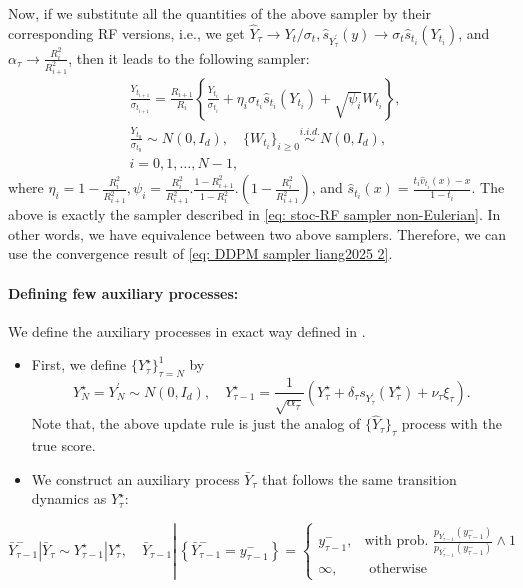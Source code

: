 \documentclass{article}
\theoremstyle{plain}
\theoremstyle{definition}
\theoremstyle{remark}
\newcommand{\bc}[1]{\left\{{#1}\right\}}
\newcommand{\br}[1]{\left({#1}\right)}
\begin{document}
Now, if we substitute all the quantities of the above sampler by their corresponding RF versions, i.e.,  we get 
$\hat Y_\tau \rightarrow  Y_{t}/\sigma_t, \widehat s_{Y^\prime_\tau }(y) \rightarrow \sigma_t \widehat s_{t_i}(Y_{t_i})$, and $\alpha_\tau \rightarrow \frac{R_i^2}{R_{i+1}^2} $, then it leads to the following sampler:
\begin{equation}
     \begin{aligned}
      &\frac{Y_{t_{i+1}}}{\sigma_{t_{i+1}}} = \frac{R_{i+1}}{R_i} \bc{ \frac{Y_{t_i}}{\sigma_{t_i}} + \eta_i \sigma_{t_i} \widehat s_{t_i}(Y_{t_i}) + \sqrt{\psi_i} W_{t_i}},\\
      &  \frac{Y_{t_0}}{\sigma_{t_0}} \sim N(0,  I_d), \quad \{W_{t_i}\}_{i \ge 0}\overset{i.i.d.}{\sim} N(0,I_d),\\
      & i = 0, 1, \ldots, N-1,
     \end{aligned}
 \end{equation}
 where $ \eta_i = 1- \frac{R_i^2}{R_{i+1}^2},   \psi_i = \frac{R_i^2}{R_{i+1}^2}.\frac{ 1 - R_{i+1}^2}{1  - R_i^2}.\br{1 - \frac{R_i^2}{R_{i+1}^2}}$, and $\widehat s_{t_i}(x) = \frac{t_i \widehat v_{t_i}(x) - x}{1 - t_i}$. The above is exactly the sampler described in \eqref{eq: stoc-RF sampler non-Eulerian}. In other words, we have equivalence between two above samplers. Therefore, we can use the convergence result of \eqref{eq: DDPM sampler liang2025 2}. 

 \paragraph{Defining few auxiliary processes:}
 We define the auxiliary processes in exact way defined in \citet[Section C.1]{liang2025low}.
 \begin{itemize}
    \item First, we define $\{Y^\star_\tau\}_{\tau = N}^1$ by 
    \[
    Y^\star_N = Y^\prime_N \sim N(0, I_d), \quad Y^\star_{\tau - 1} = \frac{1}{\sqrt{\alpha_\tau}} \br{Y^\star_\tau + \delta_\tau s_{Y^\prime_\tau}(Y^\star_\tau) + \nu_\tau \xi_\tau}.
    \]
Note that, the above update rule is just the analog of $\{\hat Y_\tau\}_\tau$ process with the true score.
 
  \item We construct an auxiliary process $\bar{Y}_{\tau}$ that follows the same transition dynamics as $Y_{\tau}^{\star}$:
\end{itemize}

\begin{equation}
\label{eq: aux process bar_Y}
\bar{Y}_{\tau - 1}^{-}\left|\bar{Y}_{\tau} \sim Y_{\tau - 1}^{\star}\right| Y_{\tau}^{\star}, \quad \bar{Y}_{\tau - 1} \left\lvert\,\left\{\bar{Y}_{\tau - 1}^{-}=y_{\tau - 1}^{-}\right\}= \begin{cases}y_{\tau - 1}^{-}, & \text {with prob. } \frac{p_{Y^\prime_{\tau - 1}}\left(y_{\tau - 1}^{-}\right)}{p_{\bar{Y}_{\tau - 1}^{-}}\left(y_{\tau - 1}^{-}\right)} \wedge 1  \\ \infty, & \text { otherwise }\end{cases}\right.
\end{equation}
\end{document}
